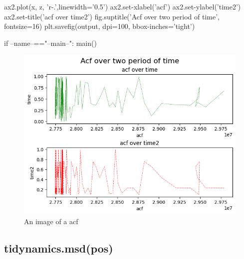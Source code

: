 \documentclass[12pt, a4paper, twoside]{report}
\begin{document}
\hspace*{10mm}    ax2.plot(x, z, 'r-.',linewidth='0.5')\newline
\hspace*{10mm}    ax2.set-xlabel('acf')\newline
\hspace*{10mm}    ax2.set-ylabel('time2')\newline
\hspace*{10mm}    ax2.set-title('acf over time2')\newline
\hspace*{10mm}     fig.suptitle('Acf over two period of time', fontsize=16)\newline
\hspace*{10mm}     plt.savefig(output, dpi=100, bbox-inches='tight')\newline

if --name--=="--main--":\newline
\hspace*{10mm}     main()  \newpage


\begin{figure}[htp]
    \centering
    \includegraphics[width=17cm]{acf1.png}
    \caption{An image of a acf}
    \label{fig:acf}
\end{figure}\newpage



\subsection{tidynamics.msd(pos)}
\end{document}
